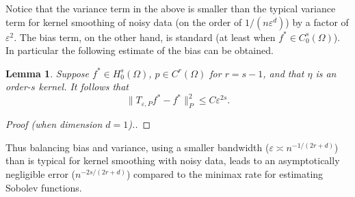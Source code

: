 \documentclass{article}
\newcommand{\1}{\mathbf{1}}
\newtheorem{lemma}{Lemma}
\theoremstyle{definition}
\theoremstyle{remark}
\begin{document}
Notice that the variance term in the above is smaller than the typical variance term for kernel smoothing of noisy data (on the order of $1/(n\varepsilon^d)$) by a factor of $\varepsilon^2$. The bias term, on the other hand, is standard (at least when $f^{\ast} \in C_0^s(\Omega)$). In particular the following estimate of the bias can be obtained. 
\begin{lemma}
	\label{lem:kernel_smoothing_bias}
	Suppose $f^{\ast} \in H_0^{s}(\Omega)$, $p \in C^{r}(\Omega)$ for $r = s - 1$, and that $\eta$ is an order-$s$ kernel. It follows that
	\begin{equation*}
	\|T_{\varepsilon,P}f^{\ast} - f^{\ast}\|_P^2 \leq C \varepsilon^{2s}.
	\end{equation*}
\end{lemma}
\begin{proof}[Proof (when dimension $d = 1$).]
\end{proof}

Thus balancing bias and variance, using a smaller bandwidth ($\varepsilon \asymp n^{-1/(2r + d)}$) than is typical for kernel smoothing with noisy data, leads to an asymptotically negligible error ($n^{-2s/(2r + d)}$) compared to the minimax rate for estimating Sobolev functions. 
\end{document}
